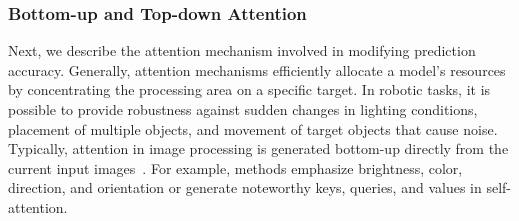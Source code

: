 \subsubsection{Bottom-up and Top-down Attention}
\label{sec_attention}

Next, we describe the attention mechanism involved in modifying prediction accuracy. Generally, attention mechanisms efficiently allocate a model's resources by concentrating the processing area on a specific target. In robotic tasks, it is possible to provide robustness against sudden changes in lighting conditions, placement of multiple objects, and movement of target objects that cause noise. Typically, attention in image processing is generated bottom-up directly from the current input images~\cite{Vaswani2017nips}. For example, methods emphasize brightness, color, direction, and orientation or generate noteworthy keys, queries, and values in self-attention.


